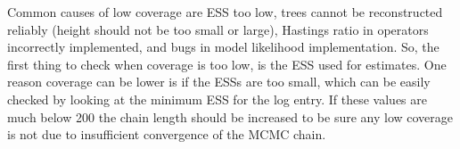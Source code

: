 \documentclass[oneside]{article}
\begin{document}
Common causes of low coverage are ESS too low,
trees cannot be reconstructed reliably (height should not be too small or large),
Hastings ratio in operators incorrectly implemented, and
bugs in model likelihood implementation.
So, the first thing to check when coverage is too low, is the ESS used for
estimates.
One reason coverage can be lower is if the ESSs are too small, which can
be easily checked by looking at the minimum ESS for the log entry. If
these values are much below 200 the chain length should be increased to
be sure any low coverage is not due to insufficient convergence of the
MCMC chain.




\vspace{1cm}


\vspace{1cm}














\end{document}
